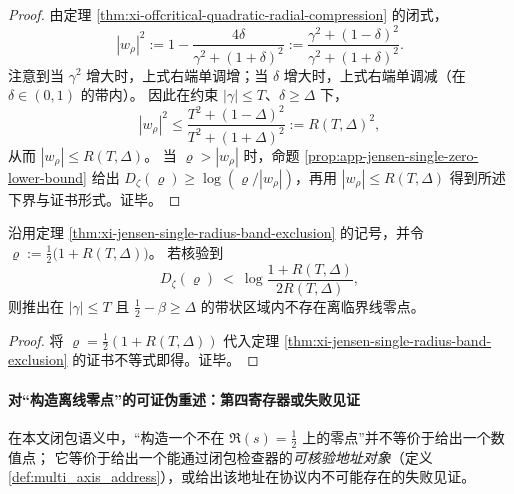 \begin{proof}
由定理 \ref{thm:xi-offcritical-quadratic-radial-compression} 的闭式，
\[
|w_\rho|^2
:=1-\frac{4\delta}{\gamma^2+(1+\delta)^2}
:=\frac{\gamma^2+(1-\delta)^2}{\gamma^2+(1+\delta)^2}.
\]
注意到当 \(\gamma^2\) 增大时，上式右端单调增；当 \(\delta\) 增大时，上式右端单调减（在 \(\delta\in(0,1)\) 的带内）。
因此在约束 \(|\gamma|\le T\)、\(\delta\ge\Delta\) 下，
\[
|w_\rho|^2
\le \frac{T^2+(1-\Delta)^2}{T^2+(1+\Delta)^2}
:=R(T,\Delta)^2,
\]
从而 \(|w_\rho|\le R(T,\Delta)\)。
当 \(\varrho>|w_\rho|\) 时，命题 \ref{prop:app-jensen-single-zero-lower-bound} 给出
\(
D_\zeta(\varrho)\ge \log(\varrho/|w_\rho|)
\)，再用 \(|w_\rho|\le R(T,\Delta)\) 得到所述下界与证书形式。证毕。
\end{proof}

\begin{corollary}[取 \texorpdfstring{$\varrho=\tfrac12(1+R(T,\Delta))$}{varrho=(1+R)/2} 的显式单点证书]\label{cor:xi-jensen-single-radius-band-exclusion-midradius}
沿用定理 \ref{thm:xi-jensen-single-radius-band-exclusion} 的记号，并令
\(
\varrho:=\tfrac12\bigl(1+R(T,\Delta)\bigr)
\)。
若核验到
\[
  D_\zeta(\varrho)\ <\ \log\frac{1+R(T,\Delta)}{2R(T,\Delta)},
\]
则推出在 \(|\gamma|\le T\) 且 \(\tfrac12-\beta\ge\Delta\) 的带状区域内不存在离临界线零点。
\end{corollary}

\begin{proof}
将 \(\varrho=\tfrac12(1+R(T,\Delta))\) 代入定理 \ref{thm:xi-jensen-single-radius-band-exclusion} 的证书不等式即得。证毕。
\end{proof}

\paragraph{对“构造离线零点”的可证伪重述：第四寄存器或失败见证}
在本文闭包语义中，“构造一个不在 \(\Re(s)=\tfrac12\) 上的零点”并不等价于给出一个数值点；
它等价于给出一个能通过闭包检查器的\emph{可核验地址对象}（定义 \ref{def:multi_axis_address}），或给出该地址在协议内不可能存在的失败见证。

